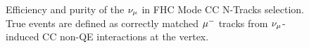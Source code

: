 \begin{figure}
\begin{centering}
\par\end{centering}
\caption[Efficiency and Purity of the $\numu$ in FHC Mode CC N-Tracks Selection]{Efficiency and purity of the $\protect\nu_{\mu}$ in FHC Mode CC N-Tracks
selection. True events are defined as correctly matched $\protect\mu^{-}$
tracks from $\protect\nu_{\mu}$-induced CC non-QE interactions at the
vertex.\label{fig:numuFHCCCNTrkRecoEffPur}}
\end{figure}

